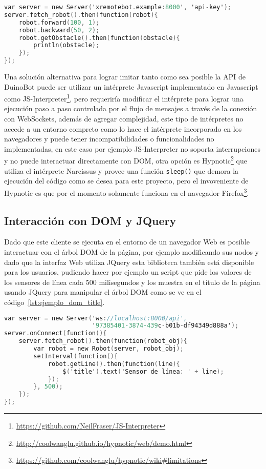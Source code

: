\begin{lstlisting}[language=C,
caption={Ejemplo de XRemoteBot en Javascript con empleo de una cola para
serializar mensajes},
label=lst:ejemplo_xremotebot_javascript_cola]
var server = new Server('xremotebot.example:8000', 'api-key');
server.fetch_robot().then(function(robot){
    robot.forward(100, 1);
    robot.backward(50, 2);
    robot.getObstacle().then(function(obstacle){
        println(obstacle);
    });
});
\end{lstlisting}


Una solución alternativa para lograr imitar tanto como sea posible la
API de DuinoBot puede ser utilizar un intérprete Javascript implementado en
Javascript como
JS-Interpreter\footnote{\url{https://github.com/NeilFraser/JS-Interpreter}},
pero requeriría modificar el intérprete para lograr una ejecución paso a paso
controlada por el flujo de mensajes a través de la conexión con WebSockets,
además de agregar complejidad, este tipo de intérpretes no accede a un entorno
compreto como lo hace el intérprete incorporado en los navegadores y puede
tener incompatibilidades o funcionalidades no implementadas, en este caso
por ejemplo JS-Interpreter no soporta interrupciones y no puede interactuar
directamente con DOM, otra opción es
Hypnotic\footnote{\url{http://coolwanglu.github.io/hypnotic/web/demo.html}}
que utiliza el intérprete Narcissus y provee una función \texttt{sleep()} que
demora la ejecución del código como se desea para este proyecto, pero el
invoveniente de Hypnotic es que por el momento solamente funciona en el
navegador
Firefox\footnote{\url{https://github.com/coolwanglu/hypnotic/wiki\#limitations}}.


\subsection{Interacción con DOM y JQuery}

Dado que este cliente se ejecuta en el entorno de un navegador Web es posible
interactuar con el árbol DOM de la página, por ejemplo modificando sus nodos y
dado que la interfaz Web utiliza JQuery esta biblioteca también está disponible
para los usuarios, pudiendo hacer por ejemplo un script que pide los valores
de los sensores de línea cada 500 milisegundos y los muestra en el título de la
página usando JQuery para manipular el árbol DOM como se ve en el
 código~\ref{lst:ejemplo_dom_title}.

\begin{lstlisting}[language=C,
caption={Manipulación de DOM con JQuery desde
XRemoteBot para Javascript},
label={lst:ejemplo_dom_title}]
var server = new Server('ws://localhost:8000/api',
                        '97385401-3874-439c-b01b-df94349d888a');
server.onConnect(function(){
    server.fetch_robot().then(function(robot_obj){
        var robot = new Robot(server, robot_obj);
        setInterval(function(){
            robot.getLine().then(function(line){
                $('title').text('Sensor de línea: ' + line);
            });
        }, 500);
    });
});
\end{lstlisting}


